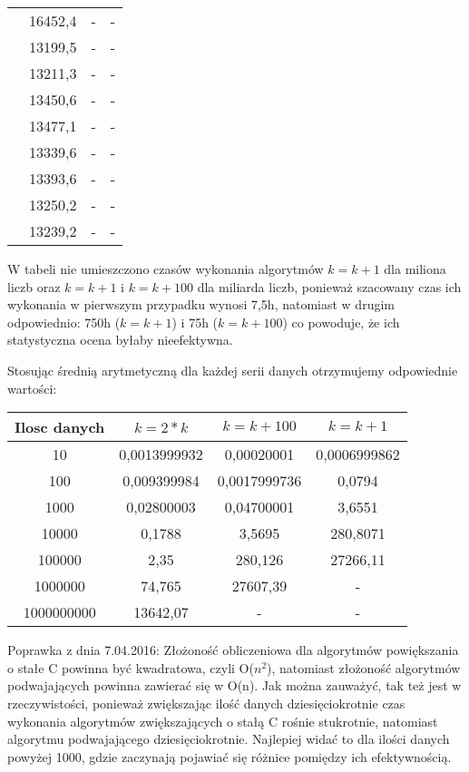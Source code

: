 \documentclass[10pt, a4paper]{article}
\begin{document}
\begin{flushleft}
\begin{table}[h]
\begin{tabular}{|c|c|c|c|}
 & 16452,4 & - & - \\
 & 13199,5 & - & - \\
 & 13211,3 & - & - \\
 & 13450,6 & - & - \\
 & 13477,1 & - & - \\
 & 13339,6 & - & - \\
 & 13393,6 & - & - \\
 & 13250,2 & - & - \\
 & 13239,2 & - & - \\ \hline
\end{tabular}
\end{table}

W tabeli nie umieszczono czasów wykonania algorytmów $k=k+1$ dla miliona liczb oraz $k=k+1$ i $k=k+100$ dla miliarda liczb, ponieważ szacowany czas ich wykonania w pierwszym przypadku wynosi 7,5h, natomiast w drugim odpowiednio: 750h ($k=k+1$) i 75h ($k=k+100$) co powoduje, że ich statystyczna ocena byłaby nieefektywna.

\newpage

Stosując średnią arytmetyczną dla każdej serii danych otrzymujemy odpowiednie wartości:
\begin{table}[h]
\centering
\begin{tabular}{|c|c|c|c|} \hline
Ilosc danych & $k=2*k$ & $k=k+100$ & $k=k+1$ \\ \hline
10 & 0,0013999932 & 0,00020001 & 0,0006999862 \\ \hline
100 & 0,009399984 & 0,0017999736 & 0,0794 \\ \hline
1000 & 0,02800003 & 0,04700001 & 3,6551 \\ \hline
10000 & 0,1788 & 3,5695 & 280,8071 \\ \hline
100000 & 2,35 & 280,126 & 27266,11 \\ \hline
1000000 & 74,765 & 27607,39 & - \\ \hline
1000000000 & 13642,07 & - & - \\ \hline
\end{tabular}
\end{table} \newline

Poprawka z dnia 7.04.2016: \newline
Złożoność obliczeniowa dla algorytmów powiększania o stałe C powinna być kwadratowa, czyli O($n^2$), natomiast złożoność algorytmów podwajających powinna zawierać się w O(n). Jak można zauważyć, tak też jest w rzeczywistości, ponieważ zwiększając ilość danych dziesięciokrotnie czas wykonania algorytmów zwiększających o stałą C rośnie stukrotnie, natomiast algorytmu podwajającego dziesięciokrotnie. Najlepiej widać to dla ilości danych powyżej 1000, gdzie zaczynają pojawiać się różnice pomiędzy ich efektywnością. \newline \newline


\end{flushleft}
\end{document}
